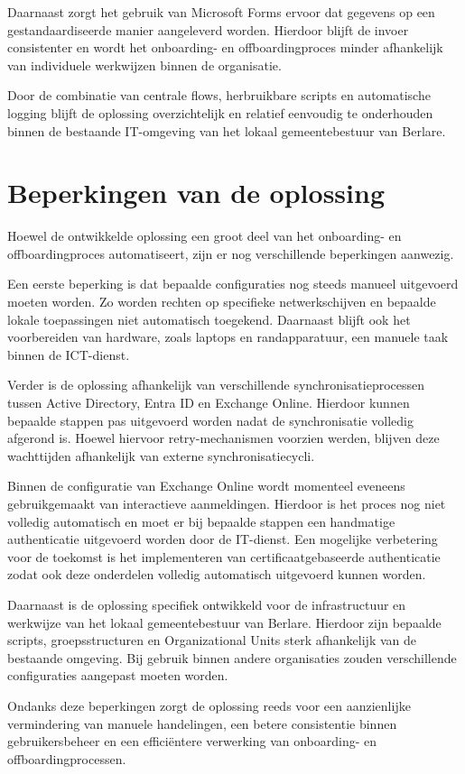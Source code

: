 Daarnaast zorgt het gebruik van Microsoft Forms ervoor dat gegevens op een gestandaardiseerde manier aangeleverd worden. Hierdoor blijft de invoer consistenter en wordt het onboarding- en offboardingproces minder afhankelijk van individuele werkwijzen binnen de organisatie.

Door de combinatie van centrale flows, herbruikbare scripts en automatische logging blijft de oplossing overzichtelijk en relatief eenvoudig te onderhouden binnen de bestaande IT-omgeving van het lokaal gemeentebestuur van Berlare.

\section{Beperkingen van de oplossing}

Hoewel de ontwikkelde oplossing een groot deel van het onboarding- en offboardingproces automatiseert, zijn er nog verschillende beperkingen aanwezig.

Een eerste beperking is dat bepaalde configuraties nog steeds manueel uitgevoerd moeten worden. Zo worden rechten op specifieke netwerkschijven en bepaalde lokale toepassingen niet automatisch toegekend. Daarnaast blijft ook het voorbereiden van hardware, zoals laptops en randapparatuur, een manuele taak binnen de ICT-dienst.

Verder is de oplossing afhankelijk van verschillende synchronisatieprocessen tussen Active Directory, Entra ID en Exchange Online. Hierdoor kunnen bepaalde stappen pas uitgevoerd worden nadat de synchronisatie volledig afgerond is. Hoewel hiervoor retry-mechanismen voorzien werden, blijven deze wachttijden afhankelijk van externe synchronisatiecycli.\newline

Binnen de configuratie van Exchange Online wordt momenteel eveneens gebruikgemaakt van interactieve aanmeldingen. Hierdoor is het proces nog niet volledig automatisch en moet er bij bepaalde stappen een handmatige authenticatie uitgevoerd worden door de IT-dienst. Een mogelijke verbetering voor de toekomst is het implementeren van certificaatgebaseerde authenticatie zodat ook deze onderdelen volledig automatisch uitgevoerd kunnen worden.

Daarnaast is de oplossing specifiek ontwikkeld voor de infrastructuur en werkwijze van het lokaal gemeentebestuur van Berlare. Hierdoor zijn bepaalde scripts, groepsstructuren en Organizational Units sterk afhankelijk van de bestaande omgeving. Bij gebruik binnen andere organisaties zouden verschillende configuraties aangepast moeten worden.

Ondanks deze beperkingen zorgt de oplossing reeds voor een aanzienlijke vermindering van manuele handelingen, een betere consistentie binnen gebruikersbeheer en een efficiëntere verwerking van onboarding- en offboardingprocessen.
